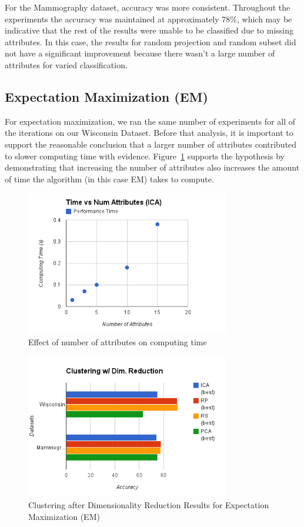 \documentclass[annual]{acmsiggraph}
\begin{document}
For the Mammography dataset, accuracy was more consistent. Throughout the experiments the accuracy was maintained at approximately 78\%, which may be indicative that the rest of the results were unable to be classified due to missing attributes. In this case, the results for random projection and random subset did not have a significant improvement because there wasn't a large number of attributes for varied classification.

\subsection{Expectation Maximization (EM)}
For expectation maximization, we ran the same number of experiments for all of the iterations on our Wisconsin Dataset. Before that analysis, it is important to support the reasonable conclusion that a larger number of attributes contributed to slower computing time with evidence. Figure~\ref{fig:timevsattr} supports the hypothesis by demonstrating that increasing the number of attributes also increases the amount of time the algorithm (in this case EM) takes to compute.
\begin{figure}[ht]
  \centering
  \includegraphics[width=3.5in]{charts/time_vs_attr_ica.png}
  \caption{Effect of number of attributes on computing time}
  \label{fig:timevsattr}
\end{figure}
\begin{figure}[ht]
  \centering
  \includegraphics[width=3.5in]{charts/clust_dim_red_2.png}
  \caption{Clustering after Dimensionality Reduction Results for Expectation Maximization (EM)}
  \label{fig:clustdimred2}
\end{figure}
\end{document}

